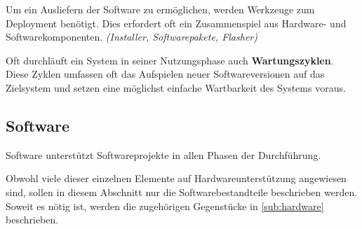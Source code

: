 Um ein Ausliefern der Software zu ermöglichen, werden Werkzeuge zum Deployment
benötigt. Dies erfordert oft ein Zusammenspiel aus Hardware-
und Softwarekomponenten. \emph{(Installer, Softwarepakete, Flasher)}

Oft durchläuft ein System in seiner Nutzungsphase auch \textbf{Wartungszyklen}.
Diese Zyklen umfassen oft das Aufspielen neuer Softwareversionen auf das
Zielsystem und setzen eine möglichst einfache Wartbarkeit des Systems
voraus.

\subsection{Software}\label{sub:software}
Software unterstützt Softwareprojekte in allen Phasen der Durchführung.

Obwohl viele dieser einzelnen Elemente auf Hardwareunterstützung angewiesen
sind, sollen in diesem Abschnitt nur die Softwarebestandteile beschrieben
werden. Soweit es nötig ist, werden die zugehörigen Gegenstücke in
\autoref{sub:hardware} beschrieben.

